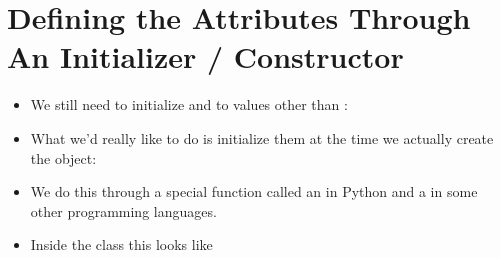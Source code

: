 \documentclass[letterpaper,10pt,english]{sphinxmanual}
\begin{document}
\section{Defining the Attributes Through An Initializer / Constructor}
\label{\detokenize{lecture_notes/lec18_classes1:defining-the-attributes-through-an-initializer-constructor}}\begin{itemize}
\item {} 
We still need to initialize  and  to values other than
:

%
\begin{sphinxVerbatim}[commandchars=\\\{\}]
  
  
  
\end{sphinxVerbatim}

\item {} 
What we’d really like to do is initialize them at the time we
actually create the  object:

%
\begin{sphinxVerbatim}[commandchars=\\\{\}]
  
\end{sphinxVerbatim}

\item {} 
We do this through a special function called an  in
Python and a  in some other programming languages.

\item {} 
Inside the class this looks like

%
\begin{sphinxVerbatim}[commandchars=\\\{\}]
 
         
          
          
\end{sphinxVerbatim}


\end{itemize}
\end{document}
